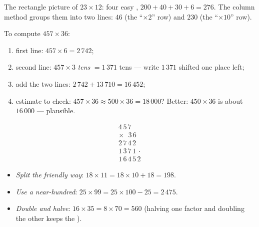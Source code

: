\begin{omfigure}

{\small The rectangle picture of $23 \times 12$: four easy ,
$200 + 40 + 30 + 6 = 276$. The column method groups them into two
lines: $46$ (the ``$\times 2$'' row) and $230$ (the ``$\times 10$''
row).}
\end{omfigure}

\begin{method}\label{met:g4:mult:column}
To compute $457 \times 36$:
\begin{enumerate}
  \item first line: $457 \times 6 = 2\,742$;
  \item second line: $457 \times 3$ \emph{tens} $= 1\,371$ tens ---
        write $1\,371$ shifted one place left;
  \item add the two lines: $2\,742 + 13\,710 = 16\,452$;
  \item estimate to check: $457 \times 36 \approx 500 \times 36
        = 18\,000$? Better: $450 \times 36$ is about $16\,000$ ---
        plausible.
\end{enumerate}
\[
\begin{array}{r}
4\,5\,7 \\
\times\ \ \,3\,6 \\
\hline
2\,7\,4\,2 \\
1\,3\,7\,1\,\cdot \\
\hline
1\,6\,4\,5\,2
\end{array}
\]
\end{method}

\begin{example}\label{ex:g4:mult:tricks}
\begin{itemize}
  \item \emph{Split the friendly way}: $18 \times 11 = 18 \times 10
        + 18 = 198$.
  \item \emph{Use a near-hundred}: $25 \times 99 = 25 \times 100 -
        25 = 2\,475$.
  \item \emph{Double and halve}: $16 \times 35 = 8 \times 70 =
        560$ (halving one factor and doubling the other keeps the
        ).
\end{itemize}
\end{example}


